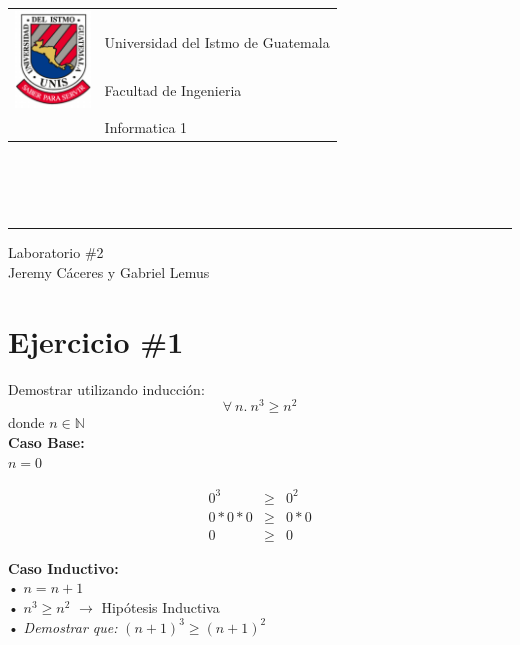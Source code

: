 \documentclass[11pt,letterpaper]{article}
\begin{document}
\begin{tabular}{l l}
\multirow{3}{*}{\includegraphics[width=2cm]{../../recursos/logo}} 
 & \\
 & \LARGE Universidad del Istmo de Guatemala \\
 & \LARGE Facultad de Ingenieria \\
 & \LARGE Informatica 1 \\
\end{tabular}
\\\\\\

\begin{center}
	\hrule
	\vspace{0.5cm}
	\huge{Laboratorio \#2} \\
	\vspace{0.1cm}
    \Large{Jeremy Cáceres y Gabriel Lemus}\\
    \vspace{0.05cm}
    \hrulefill
\end{center}
\vspace{0.3cm}

\section*{\Large Ejercicio \#1}
\noindent Demostrar utilizando inducción:
\[
        \forall\ n.\ n^3\geq n^2
\]
donde $n\in\mathbb{N}$
\\

\noindent \textbf{\large Caso Base:}\\
\noindent $n=0$

\begin{eqnarray*}
0^3 &\geq& 0^2 \\
0*0*0 &\geq& 0*0 \\
0 &\geq& 0
\end{eqnarray*}

\vspace{0.1cm}

\noindent \textbf{\large Caso Inductivo:}\\
\noindent • $n=n+1$ \\
\noindent • $ n^3 \geq n^2$ $\rightarrow$ Hipótesis Inductiva \\
\noindent • \emph{Demostrar que:} $(n+1)^3 \geq (n+1)^2$
\end{document}
